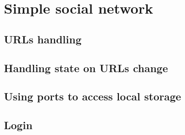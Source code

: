 \section{Simple social network}

\subsection{URLs handling}
\subsection{Handling state on URLs change}
\subsection{Using ports to access local storage}
\subsection{Login}
